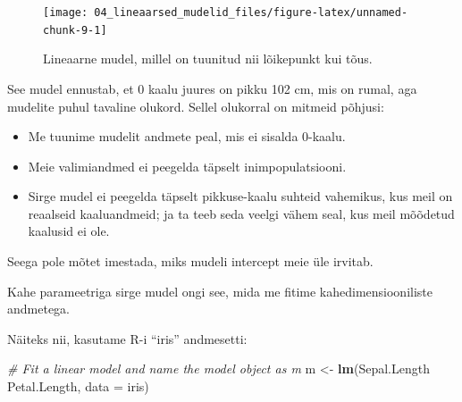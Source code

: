 \documentclass[]{book}
\newenvironment{Shaded}{\begin{snugshade}}{\end{snugshade}}
\newcommand{\KeywordTok}[1]{\textcolor[rgb]{0.13,0.29,0.53}{\textbf{#1}}}
\newcommand{\DataTypeTok}[1]{\textcolor[rgb]{0.13,0.29,0.53}{#1}}
\newcommand{\DecValTok}[1]{\textcolor[rgb]{0.00,0.00,0.81}{#1}}
\newcommand{\StringTok}[1]{\textcolor[rgb]{0.31,0.60,0.02}{#1}}
\newcommand{\CommentTok}[1]{\textcolor[rgb]{0.56,0.35,0.01}{\textit{#1}}}
\newcommand{\OtherTok}[1]{\textcolor[rgb]{0.56,0.35,0.01}{#1}}
\newcommand{\OperatorTok}[1]{\textcolor[rgb]{0.81,0.36,0.00}{\textbf{#1}}}
\newcommand{\NormalTok}[1]{#1}
\begin{document}
\begin{figure}

{\centering \texttt{[image: 04\_lineaarsed\_mudelid\_files/figure-latex/unnamed-chunk-9-1]} 

}

\caption{Lineaarne mudel, millel on tuunitud nii lõikepunkt kui tõus.}\label{fig:unnamed-chunk-9}
\end{figure}

See mudel ennustab, et 0 kaalu juures on pikku 102 cm, mis on rumal, aga
mudelite puhul tavaline olukord. Sellel olukorral on mitmeid põhjusi:

\begin{itemize}
\item
  Me tuunime mudelit andmete peal, mis ei sisalda 0-kaalu.
\item
  Meie valimiandmed ei peegelda täpselt inimpopulatsiooni.
\item
  Sirge mudel ei peegelda täpselt pikkuse-kaalu suhteid vahemikus, kus
  meil on reaalseid kaaluandmeid; ja ta teeb seda veelgi vähem seal, kus
  meil mõõdetud kaalusid ei ole.
\end{itemize}

Seega pole mõtet imestada, miks mudeli intercept meie üle irvitab.

Kahe parameetriga sirge mudel ongi see, mida me fitime
kahedimensiooniliste andmetega.

Näiteks nii, kasutame R-i ``iris'' andmesetti:

\begin{Shaded}
\begin{Highlighting}[]
\CommentTok{# Fit a linear model and name the model object as m}
\NormalTok{m <-}\StringTok{ }\KeywordTok{lm}\NormalTok{(Sepal.Length }\OperatorTok{~}\StringTok{ }\NormalTok{Petal.Length, }\DataTypeTok{data =}\NormalTok{ iris)}
\end{Highlighting}
\end{Shaded}

\begin{Shaded}
\end{Shaded}
\end{document}
